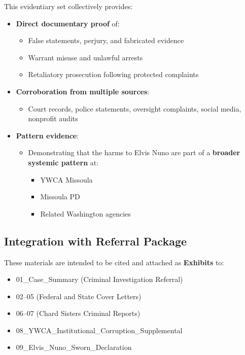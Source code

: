 \documentclass[11pt, letterpaper]{article}
\begin{document}
This evidentiary set collectively provides:

\begin{itemize}[leftmargin=*]
  \item \textbf{Direct documentary proof} of:
    \begin{itemize}
      \item False statements, perjury, and fabricated evidence
      \item Warrant misuse and unlawful arrests
      \item Retaliatory prosecution following protected complaints
    \end{itemize}
  \item \textbf{Corroboration from multiple sources}:
    \begin{itemize}
      \item Court records, police statements, oversight complaints, social media, nonprofit audits
    \end{itemize}
  \item \textbf{Pattern evidence}:
    \begin{itemize}
      \item Demonstrating that the harms to Elvis Nuno are part of a \textbf{broader systemic pattern} at:
        \begin{itemize}
          \item YWCA Missoula
          \item Missoula PD
          \item Related Washington agencies
        \end{itemize}
    \end{itemize}
\end{itemize}

\subsection{Integration with Referral Package}

These materials are intended to be cited and attached as \textbf{Exhibits} to:

\begin{itemize}[leftmargin=*]
  \item 01\_Case\_Summary (Criminal Investigation Referral)
  \item 02--05 (Federal and State Cover Letters)
  \item 06--07 (Chard Sisters Criminal Reports)
  \item 08\_YWCA\_Institutional\_Corruption\_Supplemental
  \item 09\_Elvis\_Nuno\_Sworn\_Declaration
\end{itemize}
\end{document}

